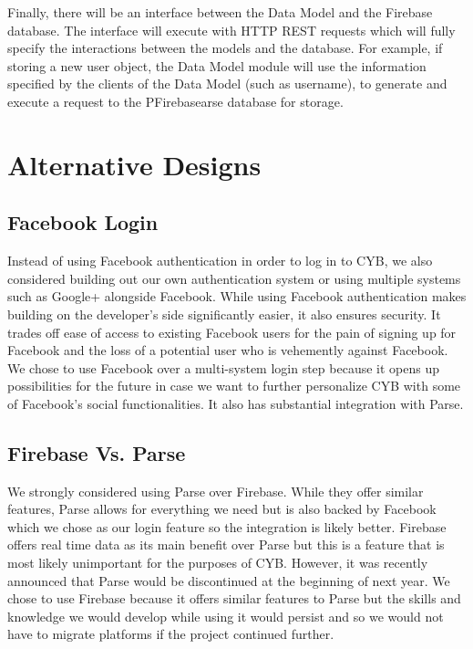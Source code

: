 \documentclass[11pt]{article}
\begin{document}
Finally, there will be an interface between the Data Model and the Firebase database. The interface will execute with HTTP REST requests which will fully specify the interactions between the models and the database. For example, if storing a new user object, the Data Model module will use the information specified by the clients of the Data Model (such as username), to generate and execute a request to the PFirebasearse database for storage.

\section*{Alternative Designs}

\subsection{Facebook Login}

Instead of using Facebook authentication in order to log in to CYB, we also considered building out our own authentication system or using multiple systems such as Google+ alongside Facebook. While using Facebook authentication makes building on the developer’s side significantly easier, it also ensures security. It trades off ease of access to existing Facebook users for the pain of signing up for Facebook and the loss of a potential user who is vehemently against Facebook. We chose to use Facebook over a multi-system login step because it opens up possibilities for the future in case we want to further personalize CYB with some of Facebook’s social functionalities. It also has substantial integration with Parse.

\subsection{Firebase Vs. Parse}

We strongly considered using Parse over Firebase. While they offer similar features, Parse allows for everything we need but is also backed by Facebook which we chose as our login feature so the integration is likely better. Firebase offers real time data as its main benefit over Parse but this is a feature that is most likely unimportant for the purposes of CYB. However, it was recently announced that Parse would be discontinued at the beginning of next year. We chose to use Firebase because it offers similar features to Parse but the skills and knowledge we would develop while using it would persist and so we would not have to migrate platforms if the project continued further.
\end{document}
